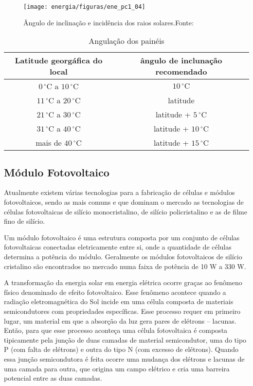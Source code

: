 	
\begin{figure}[H]
		\centering
		\texttt{[image: energia/figuras/ene\_pc1\_04]}
		\caption{ Ângulo de inclinação e incidência dos raios solares.Fonte: \cite{Villalva}}
		\label{ene_pc1_04}
	\end{figure}	
	
\begin{table}
\centering
\caption{Angulação dos painéis}
\begin{tabular}{|c|c|}
\hline 
Latitude georgáfica do local & ângulo de inclunação recomendado \\ 
\hline 
$0\,^{\circ}\mathrm{C}$ a $10\,^{\circ}\mathrm{C}$& $10\,^{\circ}\mathrm{C}$ \\ 
\hline 
$11\,^{\circ}\mathrm{C}$ a $20\,^{\circ}\mathrm{C}$&  latitude\\ 
\hline 
$21\,^{\circ}\mathrm{C}$ a $30\,^{\circ}\mathrm{C}$& latitude + $5\,^{\circ}\mathrm{C}$\\ 
\hline 
$31\,^{\circ}\mathrm{C}$ a $40\,^{\circ}\mathrm{C}$ &  latitude + $10\,^{\circ}\mathrm{C}$\\ 
\hline 
mais de $40\,^{\circ}\mathrm{C}$ &  latitude + $15\,^{\circ}\mathrm{C}$ \\ 
\hline 
\end{tabular} 
\label{ene_pc1_01_tab}
\end{table}	
	
\subsection{Módulo Fotovoltaico} 

	Atualmente existem várias tecnologias para a fabricação de células e módulos fotovoltaicos, sendo as mais comuns e que dominam o mercado as tecnologias de células fotovoltaicas de silício monocristalino, de silício policristalino e as de filme fino de silício. 
	
	Um módulo fotovoltaico é uma estrutura composta por um conjunto de células fotovoltaicas conectadas eletricamente entre si, onde a quantidade de células determina a potência do módulo. Geralmente os módulos fotovoltaicos de silício cristalino são encontrados no mercado numa faixa de potência de 10 W a 330 W.
	
	A transformação da energia solar em energia elétrica ocorre graças ao fenômeno físico denominado de efeito fotovoltaico. Esse fenômeno acontece quando a radiação eletromagnética do Sol incide em uma célula composta de materiais semicondutores com propriedades específicas. Esse processo requer em primeiro lugar, um material em que a absorção da luz gera pares de elétrons – lacunas. Então, para que esse processo aconteça uma célula fotovoltaica é composta tipicamente pela junção de duas camadas de material semicondutor, uma do tipo P (com falta de elétrons) e outra do tipo N (com excesso de elétrons). Quando essa junção semicondutora é feita ocorre uma mudança dos elétrons e lacunas de uma camada para outra, que origina um campo elétrico e cria uma barreira potencial entre as duas camadas. \cite{Bluesol}
	
